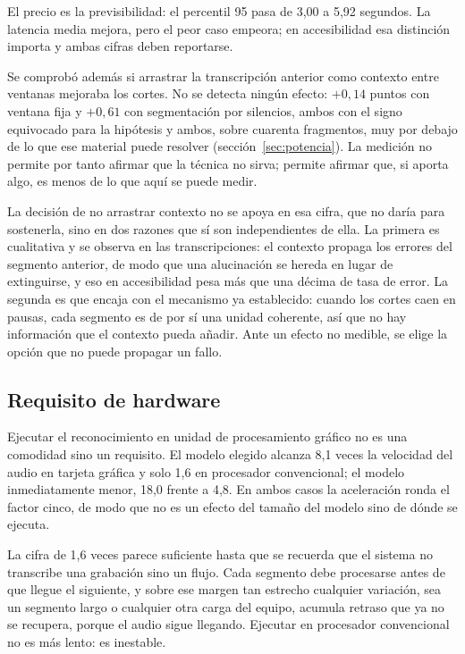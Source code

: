 El precio es la previsibilidad: el percentil 95 pasa de 3,00 a 5,92 segundos. La latencia
media mejora, pero el peor caso empeora; en accesibilidad esa distinción importa y ambas
cifras deben reportarse.

Se comprobó además si arrastrar la transcripción anterior como contexto entre ventanas
mejoraba los cortes. No se detecta ningún efecto: $+0{,}14$ puntos con ventana fija y
$+0{,}61$ con segmentación por silencios, ambos con el signo equivocado para la hipótesis y
ambos, sobre cuarenta fragmentos, muy por debajo de lo que ese material puede resolver
(sección~\ref{sec:potencia}). La medición no permite por tanto afirmar que la técnica no
sirva; permite afirmar que, si aporta algo, es menos de lo que aquí se puede medir.

La decisión de no arrastrar contexto no se apoya en esa cifra, que no daría para
sostenerla, sino en dos razones que sí son independientes de ella. La primera es
cualitativa y se observa en las transcripciones: el contexto propaga los errores del
segmento anterior, de modo que una alucinación se hereda en lugar de extinguirse, y eso en
accesibilidad pesa más que una décima de tasa de error. La segunda es que encaja con el
mecanismo ya establecido: cuando los cortes caen en pausas, cada segmento es de por sí una
unidad coherente, así que no hay información que el contexto pueda añadir. Ante un efecto
no medible, se elige la opción que no puede propagar un fallo.

\subsection{Requisito de hardware}
\label{sec:hardware}

Ejecutar el reconocimiento en unidad de procesamiento gráfico no es una comodidad sino un
requisito. El modelo elegido alcanza 8,1 veces la velocidad del audio en tarjeta gráfica y
solo 1,6 en procesador convencional; el modelo inmediatamente menor, 18,0 frente a 4,8. En
ambos casos la aceleración ronda el factor cinco, de modo que no es un efecto del tamaño del
modelo sino de dónde se ejecuta.

La cifra de 1,6 veces parece suficiente hasta que se recuerda que el sistema no transcribe
una grabación sino un flujo. Cada segmento debe procesarse antes de que llegue el siguiente,
y sobre ese margen tan estrecho cualquier variación, sea un segmento largo o cualquier otra
carga del equipo, acumula retraso que ya no se recupera, porque el audio sigue llegando.
Ejecutar en
procesador convencional no es más lento: es inestable.

